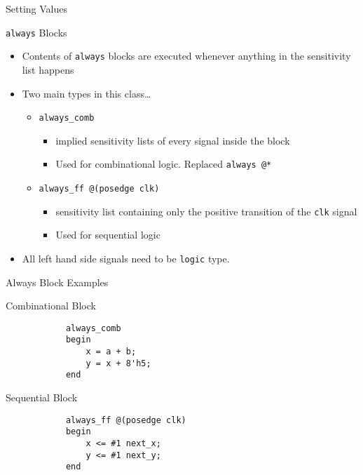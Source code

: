 \documentclass[table,dvipsnames,colorlinks=true]{beamer}
\begin{document}
\begin{frame}{Setting Values}
    \begin{block}{\texttt{always} Blocks}
        \begin{itemize}
            \item Contents of \texttt{always} blocks are executed whenever
                anything in the sensitivity list happens
            \item Two main types in this class\dots
                \begin{itemize}
                    \item \texttt{always\_comb}
                        \begin{itemize}
                            \item implied sensitivity lists of every signal 
                                inside the block
                            \item Used for combinational logic. Replaced 
                                \texttt{always @*}
                        \end{itemize}
                    \item \texttt{always\_ff @(posedge clk)} 
                        \begin{itemize}
                            \item sensitivity list containing only the positive 
                                transition of the \texttt{clk} signal
                            \item Used for sequential logic
                        \end{itemize}
                \end{itemize}
            \item All left hand side signals need to be \texttt{logic} type.
        \end{itemize}
    \end{block}
\end{frame}

\begin{frame}[fragile]{Always Block Examples}
    \begin{block}{Combinational Block}
        \begin{verbatim}
            always_comb
            begin
                x = a + b;
                y = x + 8'h5;
            end
        \end{verbatim}
    \end{block}
    \begin{block}{Sequential Block}
        \begin{verbatim}
            always_ff @(posedge clk)
            begin
                x <= #1 next_x;
                y <= #1 next_y;
            end
        \end{verbatim}
    \end{block}
\end{frame}
\end{document}
